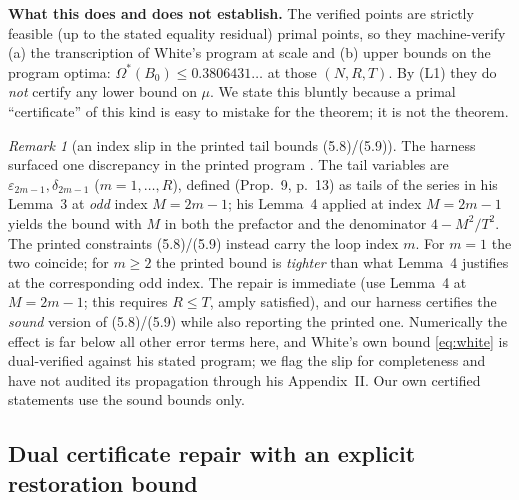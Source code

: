 \documentclass[11pt]{article}
\theoremstyle{remark}
\newtheorem{remark}[theorem]{Remark}
\newcommand{\eps}{\varepsilon}
\begin{document}
\textbf{What this does and does not establish.} The verified points are
strictly feasible (up to the stated equality residual) primal points, so
they machine-verify (a) the transcription of White's program at scale and
(b) upper bounds on the program optima:
$\Omega^\ast(B_0) \le 0.3806431\ldots$ at those $(N,R,T)$. By (L1) they do
\emph{not} certify any lower bound on $\mu$. We state this bluntly because a
primal ``certificate'' of this kind is easy to mistake for the theorem; it
is not the theorem.

\begin{remark}[an index slip in the printed tail bounds (5.8)/(5.9)]
\label{rem:index}
The harness surfaced one discrepancy in the printed program
\cite[p.~12]{White22}. The tail variables are $\eps_{2m-1},
\delta_{2m-1}$ ($m = 1, \dots, R$), defined (Prop.~9, p.~13) as tails of the
series in his Lemma~3 at \emph{odd} index $M = 2m-1$; his Lemma~4 applied at
index $M = 2m-1$ yields the bound with $M$ in both the prefactor and the
denominator $4 - M^2/T^2$. The printed constraints (5.8)/(5.9) instead carry
the loop index $m$. For $m = 1$ the two coincide; for $m \ge 2$ the printed
bound is \emph{tighter} than what Lemma~4 justifies at the corresponding odd
index. The repair is immediate (use Lemma~4 at $M = 2m-1$; this requires
$R \le T$, amply satisfied), and our harness certifies the \emph{sound}
version of (5.8)/(5.9) while also reporting the printed one. Numerically
the effect is far below all other error terms here, and White's own bound
\eqref{eq:white} is dual-verified against his stated program; we flag the
slip for completeness and have not audited its propagation through his
Appendix~II. Our own certified statements use the sound bounds only.
\end{remark}

\subsection{Dual certificate repair with an explicit restoration bound}
\label{sec:repair}
\end{document}
